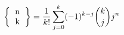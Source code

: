 $$ 
\left \{
  \begin{tabular}{c}
  n \\
  k
  \end{tabular}
\right \} = \frac{1}{k!}\sum_{j=0}^{k} (-1)^{k-j} \binom{k}{j} j^n
$$
\hline
